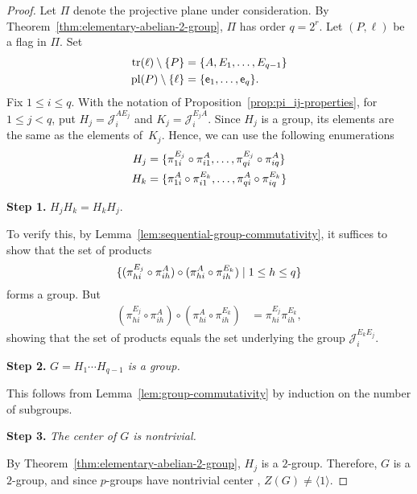 \begin{proof}
    Let $\Pi$ denote the projective plane under consideration. By Theorem~\ref{thm:elementary-abelian-2-group}, $\Pi$ has order $q=2^r$. Let $(P,\ell)$ be a flag in $\Pi$. Set
    \begin{align*}
        \operatorname{tr}(\ell)\setminus\{P\} &= \{A,E_1,\dots,E_{q-1}\}\\
        \operatorname{pl}(P)\setminus\{\ell\} &= \{\mathsf e_1,\dots,\mathsf e_q\}.
    \end{align*}
    Fix $1\le i\le q$. With the notation of Proposition~\ref{prop:pi_ij-properties}, for $1\le j<q$, put $H_j=\mathcal J_i^{AE_j}$ and $K_j=\mathcal J_i^{E_jA}$. Since $H_j$ is a group, its elements are the same as the elements of~$K_j$. Hence, we can use the following enumerations
    \begin{align*}
        H_j &= \{\pi_{1i}^{E_j}\circ\pi_{i1}^A,\dots,
            \pi_{qi}^{E_j}\circ\pi_{iq}^A\}\\
        H_k &= \{\pi_{1i}^A\circ\pi_{i1}^{E_k},\dots,
            \pi_{qi}^A\circ\pi_{iq}^{E_k}\}
    \end{align*}

    \medskip
    \textbf{Step 1.} $H_jH_k=H_kH_j$.

    To verify this, by Lemma~\ref{lem:sequential-group-commutativity}, it suffices to show that the set of products
    \[
        \{(\pi_{hi}^{E_j}\circ\pi_{ih}^A)\circ
        (\pi_{hi}^A\circ\pi_{ih}^{E_k})
        \mid1\le h\le q\}
    \]
    forms a group. But
    \begin{align*}
        (\pi_{hi}^{E_j}\circ\pi_{ih}^A)\circ
                (\pi_{hi}^A\circ\pi_{ih}^{E_k})
            &= \pi_{hi}^{E_j}\pi_{ih}^{E_k},
    \end{align*}
    showing that the set of products equals the set underlying the group $\mathcal J_i^{E_kE_j}$.

    \medskip

    \textbf{Step 2.} \textit{$G=H_1\cdots H_{q-1}$ is a group.}

    This follows from Lemma~\ref{lem:group-commutativity} by induction on the number of subgroups.

    \medskip

    \textbf{Step 3.} \textit{The center of\/ $G$ is nontrivial.}
    
    By Theorem~\ref{thm:elementary-abelian-2-group}, $H_j$ is a $2$-group. Therefore, $G$ is a $2$-group, and since $p$-groups have nontrivial center \citep{LC-Groups}, $Z(G)\ne\langle1\rangle$.


\end{proof}

